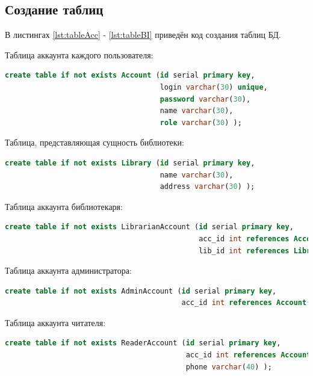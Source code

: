 \subsection{Создание таблиц}
В листингах \ref{lst:tableAcc} - \ref{lst:tableBI} приведён код создания таблиц БД. 

Таблица аккаунта каждого пользователя:
\begin{lstlisting}[label=lst:tableAcc, caption=Создание таблицы Account, language=sql]
create table if not exists Account (id serial primary key,
                                    login varchar(30) unique,
                                    password varchar(30),
                                    name varchar(30),
                                    role varchar(30) );
\end{lstlisting}

Таблица, представляющая сущность библиотеки:
\begin{lstlisting}[label=lst:tableLib, caption=Создание таблицы Library, language=sql]
create table if not exists Library (id serial primary key,
                                    name varchar(30),
                                    address varchar(30) );
\end{lstlisting}

Таблица аккаунта библиотекаря:
\begin{lstlisting}[label=lst:tableLAcc, caption=Создание таблицы LibrarianAccount, language=sql]
create table if not exists LibrarianAccount (id serial primary key,
                                             acc_id int references Account(id),
                                             lib_id int references Library(id) );
\end{lstlisting}

Таблица аккаунта администратора:
\begin{lstlisting}[label=lst:tableAAcc, caption=Создание таблицы AdminAccount, language=sql]
create table if not exists AdminAccount (id serial primary key,
                                         acc_id int references Account(id) );
\end{lstlisting}

Таблица аккаунта читателя:
\begin{lstlisting}[label=lst:tableRAcc, caption=Создание таблицы ReaderAccount, language=sql]
create table if not exists ReaderAccount (id serial primary key,
                                          acc_id int references Account(id),
                                          phone varchar(40) );
\end{lstlisting}

